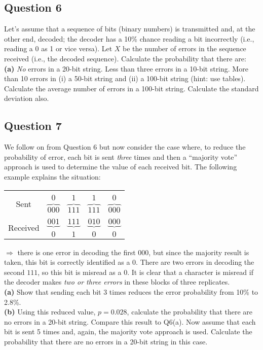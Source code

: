 
\subsection*{Question 6}

Let's assume that a sequence of bits (binary numbers) is transmitted and, at the other end, decoded; the decoder has a 10\% chance reading a bit incorrectly (i.e., reading a 0 as 1 or vice versa). Let $X$ be the number of errors in the sequence received (i.e., the decoded sequence). Calculate the probability that there are: \\[-0.2cm]

{\bf(a)} \emph{No} errors in a 20-bit string.  Less than three errors in a 10-bit string.  More than 10 errors in (i) a 50-bit string and (ii) a 100-bit string (hint: use tables).  Calculate the average number of errors in a 100-bit string. Calculate the standard deviation also.


\subsection*{Question 7}
We follow on from Question 6 but now consider the case where, to reduce the probability of error, each bit is sent \emph{three} times and then a ``majority vote'' approach is used to determine the value of each received bit. The following example explains the situation:\\[-0.5cm]
\begin{center}
	\begin{tabular}{ccccc}
		\hline
		&&&&\\[-0.3cm]
		\multirow{2}{*}{Sent} & $0$ & $1$ & $1$ & $0$ \\
		& $\overbrace{000}$ & $\overbrace{111}$ & $\overbrace{111}$ & $\overbrace{000}$ \\[0.2cm]
		\hline
		&&&&\\[-0.3cm]
		\multirow{2}{*}{Received} & $\underbrace{001}$ & $\underbrace{111}$ & $\underbrace{010}$ & $\underbrace{000}$ \\
		& $0$ & $1$ & $0$ & $0$ \\[0.2cm]
		\hline
	\end{tabular}
\end{center}
$\Rightarrow$ there is one error in decoding the first $000$, but since the majority result is taken, this bit is correctly identified as a $0$. There are two errors in decoding the second $111$, so this bit is misread as a $0$. It is clear that a character is misread if the decoder makes \emph{two or three errors} in these blocks of three replicates.\\[-0.2cm]

{\bf(a)} Show that sending each bit 3 times reduces the error probability from 10\% to 2.8\%. \quad\\ {\bf(b)} Using this reduced value, $p=0.028$, calculate the probability that there are no errors in a 20-bit string. Compare this result to Q6(a).  Now assume that each bit is sent 5 times and, again, the majority vote approach is used. Calculate the probability that there are no errors in a 20-bit string in this case. %
